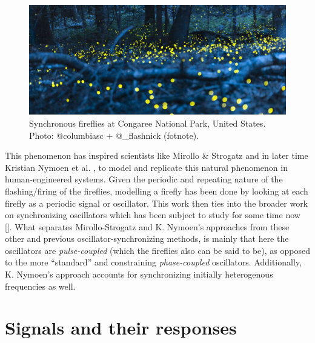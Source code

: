 \begin{figure}[!ht]
	\centering
	\includegraphics[width=0.9\linewidth]{Assets/Figures/synchronized_fireflies_phenomenon.jpg}
	\caption[Picture of fireflies flashing synchronously in a US National Park]{Synchronous fireflies at Congaree National Park, United States. Photo: @columbiasc + @\_flashnick (fotnote).} %
	\label{fig:synched_fireflies_phenomenon}
\end{figure}

This phenomenon has inspired scientists like Mirollo \& Strogatz \cite{mirollo_strogatz_PCO_synch} and in later time Kristian Nymoen et al. \cite{nymoen_synch}, to model and replicate this natural phenomenon in human-engineered systems. Given the periodic and repeating nature of the flashing/firing of the fireflies, modelling a firefly has been done by looking at each firefly as a periodic signal or oscillator. This work \cite{mirollo_strogatz_PCO_synch, nymoen_synch} then ties into the broader work on synchronizing oscillators which has been subject to study for some time now []. What separates Mirollo-Strogatz and K. Nymoen's approaches from these other and previous oscillator-synchronizing methods, is mainly that here the oscillators are \textit{pulse-coupled} (which the fireflies also can be said to be), as opposed to the more ``standard'' and constraining \textit{phase-coupled} oscillators. Additionally, K. Nymoen's approach accounts for synchronizing initially heterogenous frequencies as well.










\section{Signals and their responses}


